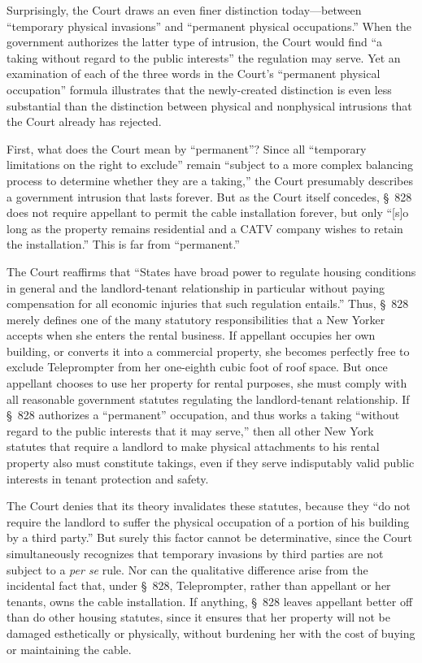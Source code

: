 Surprisingly, the Court draws an even finer distinction today---between
``temporary physical invasions'' and ``permanent physical occupations.'' When
the government authorizes the latter type of intrusion, the Court would find ``a
taking without regard to the public interests'' the regulation may serve. Yet an
examination of each of the three words in the Court's ``permanent physical
occupation'' formula illustrates that the newly-created distinction is even less
substantial than the distinction between physical and nonphysical intrusions
that the Court already has rejected.

First, what does the Court mean by ``permanent''? Since all ``temporary
limitations on the right to exclude'' remain ``subject to a more complex
balancing process to determine whether they are a taking,'' the Court presumably
describes a government intrusion that lasts forever. But as the Court itself
concedes, \S~828 does not require appellant to permit the cable installation
forever, but only ``[s]o long as the property remains residential and a CATV
company wishes to retain the installation.'' This is far from ``permanent.''

The Court reaffirms that ``States have broad power to regulate housing
conditions in general and the landlord-tenant relationship in particular without
paying compensation for all economic injuries that such regulation entails.''
Thus, \S~828 merely defines one of the many statutory responsibilities that a
New Yorker accepts when she enters the rental business. If appellant occupies
her own building, or converts it into a commercial property, she becomes
perfectly free to exclude Teleprompter from her one-eighth cubic foot of roof
space. But once appellant chooses to use her property for rental purposes, she
must comply with all reasonable government statutes regulating the
landlord-tenant relationship. If \S~828 authorizes a ``permanent'' occupation,
and thus works a taking ``without regard to the public interests that it may
serve,'' then all other New York statutes that require a landlord to make
physical attachments to his rental property also must constitute takings, even
if they serve indisputably valid public interests in tenant protection and
safety.

The Court denies that its theory invalidates these statutes, because they ``do
not require the landlord to suffer the physical occupation of a portion of his
building by a third party.'' But surely this factor cannot be determinative,
since the Court simultaneously recognizes that temporary invasions by third
parties are not subject to a \textit{per se} rule. Nor can the qualitative
difference arise from the incidental fact that, under \S~828, Teleprompter,
rather than appellant or her tenants, owns the cable installation. If anything,
\S~828 leaves appellant better off than do other housing statutes, since it
ensures that her property will not be damaged esthetically or physically,
without burdening her with the cost of buying or maintaining the cable.

